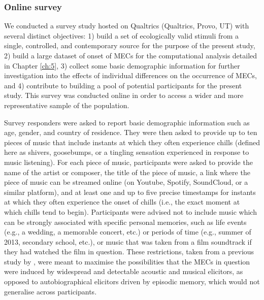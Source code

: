 \subsubsection{Online survey}

We conducted a survey study hosted on Qualtrics (Qualtrics, Provo, UT) with several distinct objectives: 1) build a set of ecologically valid stimuli from a single, controlled, and contemporary source for the purpose of the present study, 2) build a large dataset of onset of MECs for the computational analysis detailed in Chapter \ref{ch:5}, 3) collect some basic demographic information for further investigation into the effects of individual differences on the occurrence of MECs, and 4) contribute to building a pool of potential participants for the present study. This survey was conducted online in order to access a wider and more representative sample of the population.

Survey responders were asked to report basic demographic information such as age, gender, and country of residence. They were then asked to provide up to ten pieces of music that include instants at which they often experience chills (defined here as shivers, goosebumps, or a tingling sensation experienced in response to music listening). For each piece of music, participants were asked to provide the name of the artist or composer, the title of the piece of music, a link where the piece of music can be streamed online (on Youtube, Spotify, SoundCloud, or a similar platform), and at least one and up to five precise timestamps for instants at which they often experience the onset of chills (i.e., the exact moment at which chills tend to begin). Participants were advised not to include music which can be strongly associated with specific personal memories, such as life events (e.g., a wedding, a memorable concert, etc.) or periods of time (e.g., summer of 2013, secondary school, etc.), or music that was taken from a film soundtrack if they had watched the film in question. These restrictions, taken from a previous study by \textcite{salimpoor2009}, were meant to maximise the possibilities that the MECs in question were induced by widespread and detectable acoustic and musical elicitors, as opposed to autobiographical elicitors driven by episodic memory, which would not generalise across participants.

